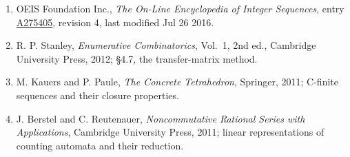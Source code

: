 \documentclass[11pt]{article}
\theoremstyle{definition}
\begin{document}
\begin{enumerate}

\item OEIS Foundation Inc., \emph{The On-Line Encyclopedia of Integer Sequences}, entry \href{https://oeis.org/A275405}{A275405}, revision 4, last modified Jul 26 2016.

\item R. P. Stanley, \emph{Enumerative Combinatorics}, Vol.~1, 2nd ed., Cambridge University Press, 2012; \S4.7, the transfer-matrix method.

\item M. Kauers and P. Paule, \emph{The Concrete Tetrahedron}, Springer, 2011; C-finite sequences and their closure properties.

\item J. Berstel and C. Reutenauer, \emph{Noncommutative Rational Series with Applications}, Cambridge University Press, 2011; linear representations of counting automata and their reduction.

\end{enumerate}
\end{document}
